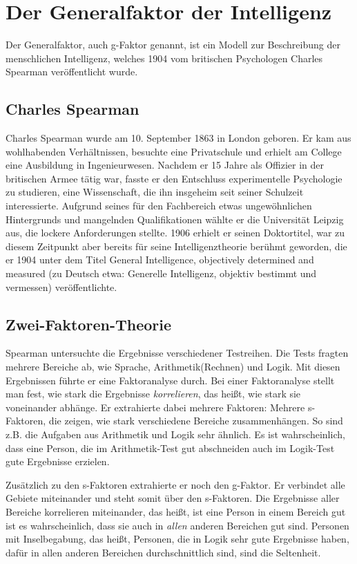 \chapter{Der Generalfaktor der Intelligenz}

Der Generalfaktor, auch g-Faktor genannt, ist ein Modell zur Beschreibung der
menschlichen Intelligenz, welches 1904 vom britischen Psychologen
Charles Spearman veröffentlicht wurde. \cite{wiki_spearman}

\section{Charles Spearman}
Charles Spearman wurde am 10. September 1863 in London geboren. \cite{wiki_spearman} Er kam aus wohlhabenden Verhältnissen, besuchte eine Privatschule und erhielt am College eine Ausbildung in Ingenieurwesen. Nachdem er 15 Jahre als Offizier in der britischen Armee tätig war, fasste er den Entschluss experimentelle Psychologie zu studieren, eine Wissenschaft, die ihn insgeheim seit seiner Schulzeit interessierte. \cite{galton_spearman} Aufgrund seines für den Fachbereich etwas ungewöhnlichen Hintergrunds und mangelnden Qualifikationen wählte er die Universität Leipzig aus, die lockere Anforderungen stellte. 1906 erhielt er seinen Doktortitel, war zu diesem Zeitpunkt aber bereits für seine Intelligenztheorie berühmt geworden, die er 1904 unter dem Titel \glqq General Intelligence, objectively determined and measured\grqq{} (zu Deutsch etwa: Generelle Intelligenz, objektiv bestimmt und vermessen) veröffentlichte.
\cite{wiki_en_spearman} \cite{york_spearman}

\section{Zwei-Faktoren-Theorie}
Spearman untersuchte die Ergebnisse verschiedener Testreihen. Die Tests fragten mehrere Bereiche ab, wie Sprache, Arithmetik(Rechnen) und Logik. Mit diesen Ergebnissen führte er eine Faktoranalyse durch. Bei einer Faktoranalyse stellt man fest, wie stark die Ergebnisse \emph{korrelieren}, das heißt, wie stark sie voneinander abhänge. Er extrahierte dabei mehrere Faktoren: Mehrere s-Faktoren, die zeigen, wie stark verschiedene Bereiche zusammenhängen. So sind z.B. die Aufgaben aus Arithmetik und Logik sehr ähnlich. Es ist wahrscheinlich, dass eine Person, die im Arithmetik-Test gut abschneiden auch im Logik-Test gute Ergebnisse erzielen.

Zusätzlich zu den s-Faktoren extrahierte er noch den g-Faktor. Er verbindet alle Gebiete miteinander und steht somit über den s-Faktoren. Die Ergebnisse aller Bereiche korrelieren miteinander, das heißt, ist eine Person in einem Bereich gut ist es wahrscheinlich, dass sie auch in \emph{allen} anderen Bereichen gut sind. Personen mit Inselbegabung, das heißt, Personen, die in Logik sehr gute Ergebnisse haben, dafür in allen anderen Bereichen durchschnittlich sind, sind die Seltenheit.

